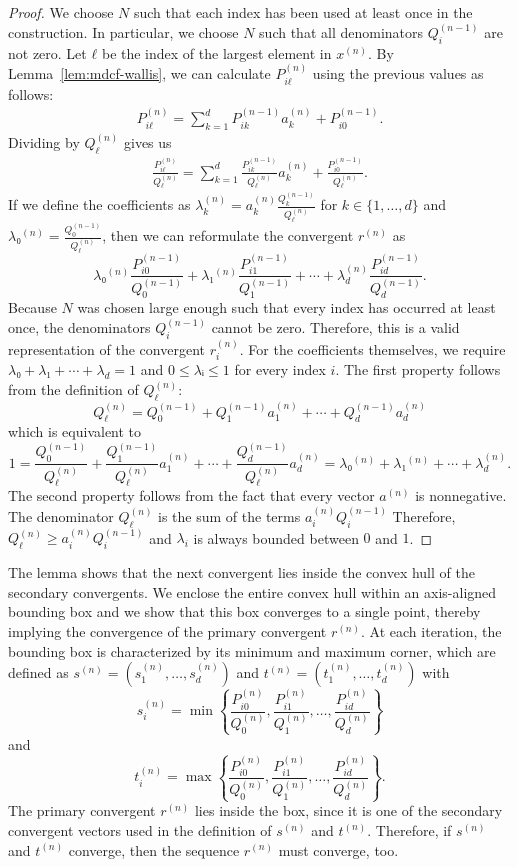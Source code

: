 \begin{proof}
  We choose $N$ such that each index has been used at least once in the construction.
  In particular, we choose $N$ such that all denominators $Q_i^{(n-1)}$ are not zero.
  Let $ℓ$ be the index of the largest element in $x^{(n)}$.
  By Lemma~\ref{lem:mdcf-wallis}, we can calculate $P_{iℓ}^{(n)}$ using the previous values as follows:
  \begin{align*}
    P_{iℓ}^{(n)} = \sum_{k = 1}^d P_{ik}^{(n-1)} a_k^{(n)} + P_{i0}^{(n-1)}.
  \end{align*}
  Dividing by $Q_ℓ^{(n)}$ gives us
  \begin{align*}
    \frac{P_{iℓ}^{(n)}}{Q_ℓ^{(n)}} = \sum_{k = 1}^d \frac{P_{ik}^{(n-1)}}{Q_ℓ^{(n)}} a_k^{(n)} + \frac{P_{i0}^{(n-1)}}{Q_ℓ^{(n)}}.
  \end{align*}
  If we define the coefficients as $λ_k^{(n)} = a_k^{(n)} \frac{Q_k^{(n-1)}}{Q_ℓ^{(n)}}$ for $k ∈ \{1, …, d\}$
  and $λ₀^{(n)} = \frac{Q_0^{(n-1)}}{Q_ℓ^{(n)}}$,
  then we can reformulate the convergent $r^{(n)}$ as
  \[
    λ₀^{(n)} \frac{P_{i0}^{(n-1)}}{Q_0^{(n-1)}} + λ₁^{(n)} \frac{P_{i1}^{(n-1)}}{Q_1^{(n-1)}} + ⋯ + λ_d^{(n)} \frac{P_{id}^{(n-1)}}{Q_d^{(n-1)}}.
  \]
  Because $N$ was chosen large enough such that every index has occurred at least once,
  the denominators $Q_i^{(n-1)}$ cannot be zero.
  Therefore, this is a valid representation of the convergent $r_i^{(n)}$.
  For the coefficients themselves, we require $λ₀ + λ₁ + ⋯ + λ_d = 1$ and $0 ≤ λᵢ ≤ 1$ for every index $i$.
  The first property follows from the definition of $Q_ℓ^{(n)}$:
  \[
    Q_ℓ^{(n)} = Q_0^{(n-1)} + Q_1^{(n-1)} a_1^{(n)} + ⋯ + Q_d^{(n-1)} a_d^{(n)}
  \]
  which is equivalent to
  \[
    1 = \frac{Q_0^{(n-1)}}{Q_ℓ^{(n)}} + \frac{Q_1^{(n-1)}}{Q_ℓ^{(n)}} a_1^{(n)} + ⋯ + \frac{Q_d^{(n-1)}}{Q_ℓ^{(n)}} a_d^{(n)} = λ₀^{(n)} + λ₁^{(n)} + ⋯ + λ_d^{(n)}.
  \]
  The second property follows from the fact that every vector $a^{(n)}$ is nonnegative.
  The denominator $Q_ℓ^{(n)}$ is the sum of the terms $a_i^{(n)} Q_i^{(n-1)}$
  Therefore, $Q_ℓ^{(n)} ≥ a_i^{(n)} Q_i^{(n-1)}$ and $λ_i$ is always bounded between $0$ and $1$.
\end{proof}

The lemma shows that the next convergent lies inside the convex hull of the secondary convergents.
We enclose the entire convex hull within an axis-aligned bounding box
and we show that this box converges to a single point,
thereby implying the convergence of the primary convergent $r^{(n)}$.
At each iteration, the bounding box is characterized by its minimum and maximum corner,
which are defined as $s^{(n)} = (s_1^{(n)}, …, s_d^{(n)})$ and $t^{(n)} = (t_1^{(n)}, …, t_d^{(n)})$ with
\[
  s_i^{(n)} = \min\left\{\frac{P_{i0}^{(n)}}{Q_0^{(n)}}, \frac{P_{i1}^{(n)}}{Q_1^{(n)}}, …, \frac{P_{id}^{(n)}}{Q_d^{(n)}}\right\}
\]
and
\[
  t_i^{(n)} = \max\left\{\frac{P_{i0}^{(n)}}{Q_0^{(n)}}, \frac{P_{i1}^{(n)}}{Q_1^{(n)}}, …, \frac{P_{id}^{(n)}}{Q_d^{(n)}}\right\}.
\]
The primary convergent $r^{(n)}$ lies inside the box,
since it is one of the secondary convergent vectors
used in the definition of $s^{(n)}$ and $t^{(n)}$.
Therefore, if $s^{(n)}$ and $t^{(n)}$ converge,
then the sequence $r^{(n)}$ must converge, too.

